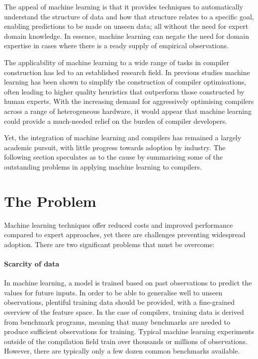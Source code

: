 The appeal of machine learning is that it provides techniques to automatically understand the structure of data and how that structure relates to a specific goal, enabling predictions to be made on unseen data; all without the need for expert domain knowledge. In essence, machine learning can negate the need for domain expertise in cases where there is a ready supply of empirical observations.

The applicability of machine learning to a wide range of tasks in compiler construction has led to an established research field. In previous studies machine learning has been shown to simplify the construction of compiler optimisations, often leading to higher quality heuristics that outperform those constructed by human experts. With the increasing demand for aggressively optimising compilers across a range of heterogeneous hardware, it would appear that machine learning could provide a much-needed relief on the burden of compiler developers.

Yet, the integration of machine learning and compilers has remained a largely academic pursuit, with little progress towards adoption by industry. The following section speculates as to the cause by summarising some of the outstanding problems in applying machine learning to compilers.


\section{The Problem}

Machine learning techniques offer reduced costs and improved performance compared to expert approaches, yet there are challenges preventing widespread adoption. There are two significant problems that must be overcome:

\paragraph*{Scarcity of data} In machine learning, a model is trained based on past observations to predict the values for future inputs. In order to be able to generalise well to unseen observations, plentiful training data should be provided, with a fine-grained overview of the feature space. In the case of compilers, training data is derived from benchmark programs, meaning that many benchmarks are needed to produce sufficient observations for training. Typical machine learning experiments outside of the compilation field train over thousands or millions of observations. However, there are typically only a few dozen common benchmarks available.

